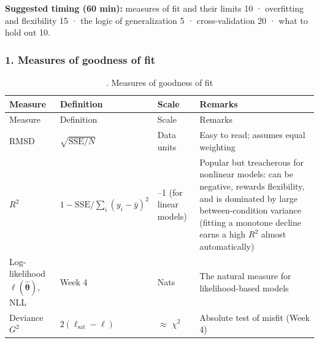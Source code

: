\textbf{Suggested timing (60 min):} measures of fit and their limits 10
· overfitting and flexibility 15 · the logic of generalization 5 ·
cross-validation 20 · what to hold out 10.

\subsubsection{1. Measures of goodness of fit}

\begin{longtable}[]{@{}
  >{\raggedright\arraybackslash}p{}
  >{\raggedright\arraybackslash}p{}
  >{\raggedright\arraybackslash}p{}
  >{\raggedright\arraybackslash}p{}@{}}
\caption{. Measures of goodness of fit}\tabularnewline
\toprule\noalign{}
\begin{minipage}[b]{\linewidth}\raggedright
Measure
\end{minipage} & \begin{minipage}[b]{\linewidth}\raggedright
Definition
\end{minipage} & \begin{minipage}[b]{\linewidth}\raggedright
Scale
\end{minipage} & \begin{minipage}[b]{\linewidth}\raggedright
Remarks
\end{minipage} \\
\midrule\noalign{}
\endfirsthead
\toprule\noalign{}
\begin{minipage}[b]{\linewidth}\raggedright
Measure
\end{minipage} & \begin{minipage}[b]{\linewidth}\raggedright
Definition
\end{minipage} & \begin{minipage}[b]{\linewidth}\raggedright
Scale
\end{minipage} & \begin{minipage}[b]{\linewidth}\raggedright
Remarks
\end{minipage} \\
\midrule\noalign{}
\endhead
\bottomrule\noalign{}
\endlastfoot
RMSD & \(\sqrt{\mathrm{SSE}/N}\) & Data units & Easy to read; assumes
equal weighting \\
\(R^2\) & \(1 - \mathrm{SSE}/\sum_i (y_i - \bar y)^2\) & 0--1 (for
linear models) & Popular but treacherous for nonlinear models: can be
negative, rewards flexibility, and is dominated by large
between-condition variance (fitting a monotone decline earns a high
\(R^2\) almost automatically) \\
Log-likelihood \(\ell(\hat{\boldsymbol\theta})\), NLL & Week 4 & Nats &
The natural measure for likelihood-based models \\
Deviance \(G^2\) & \(2(\ell_{\text{sat}} - \ell)\) & \ensuremath{\approx} \(\chi^2\) &
Absolute test of misfit (Week 4) \\
\end{longtable}

